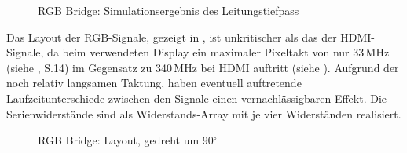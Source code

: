 \begin{figure}[htbp]
 			\caption{RGB Bridge: Simulationsergebnis des Leitungstiefpass}
            \label{fig:teilb_tiefpass_mess}
\end{figure}
Das Layout der RGB-Signale, gezeigt in , ist unkritischer als das der HDMI-Signale, da beim verwendeten Display ein maximaler Pixeltakt von nur 33\,MHz (siehe \cite{LG2012}, S.14) im Gegensatz zu 340\,MHz bei HDMI auftritt (siehe \cite{itwissen2014}). Aufgrund der noch relativ langsamen Taktung, haben eventuell auftretende Laufzeitunterschiede zwischen den Signale einen vernachlässigbaren Effekt. Die Serienwiderstände sind als Widerstands-Array mit je vier Widerständen realisiert.
\begin{figure}[htp]
	\center
 	\caption{RGB Bridge: Layout, gedreht um 90$^{\circ}$} 
    \label{fig:teilb_rgb_bridge_pcb}
\end{figure}
\newpage
